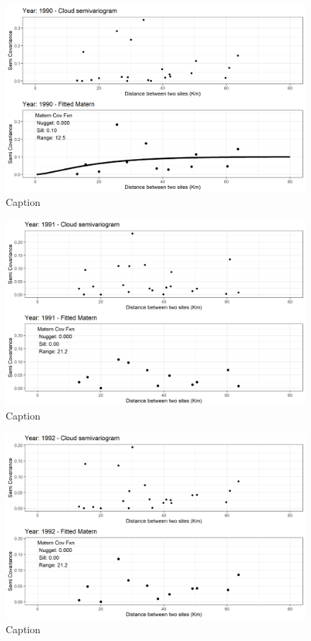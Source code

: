 \begin{figure}
    \centering
    \includegraphics{Figures/EmpiricalVariograms/Empirical_Variogram_1990.png}
    \caption{Caption}
    \label{fig:my_label}
\end{figure}

\begin{figure}
    \centering
    \includegraphics{Figures/EmpiricalVariograms/Empirical_Variogram_1991.png}
    \caption{Caption}
    \label{fig:my_label}
\end{figure}

\begin{figure}
    \centering
    \includegraphics{Figures/EmpiricalVariograms/Empirical_Variogram_1992.png}
    \caption{Caption}
    \label{fig:my_label}
\end{figure}


